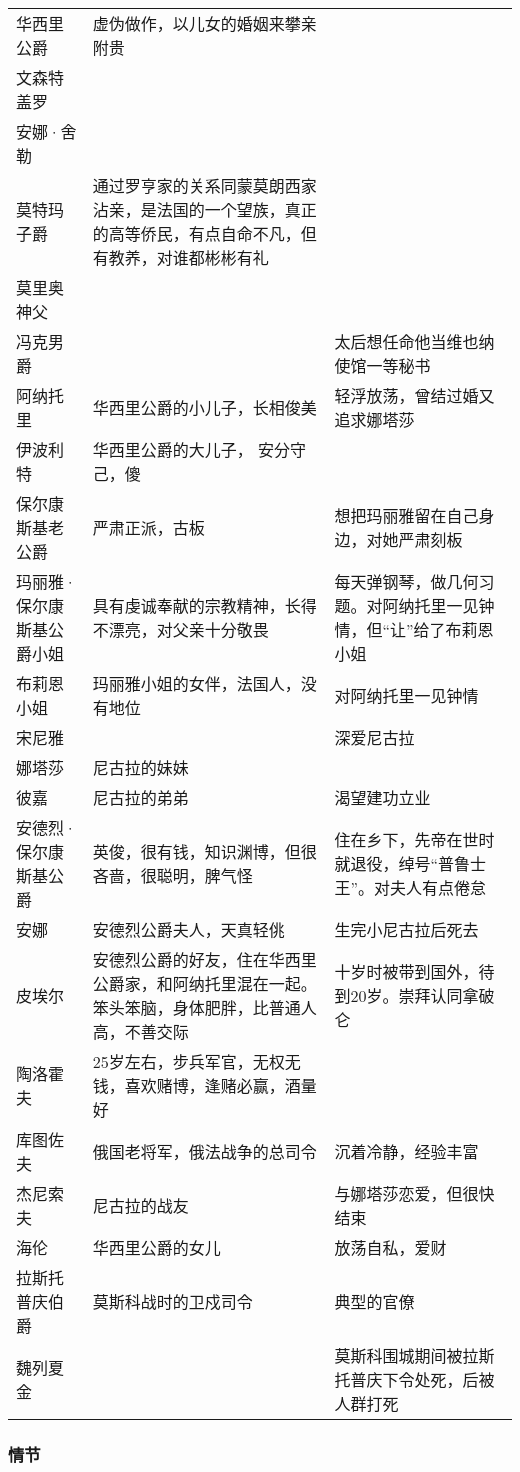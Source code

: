 \begin{longtable}{p{}|p{}|p{}}
华西里公爵 & 虚伪做作，以儿女的婚姻来攀亲附贵 & \\
文森特盖罗 & & \\ 
安娜·舍勒 & & \\
莫特玛子爵 & 通过罗亨家的关系同蒙莫朗西家沾亲，是法国的一个望族，真正的高等侨民，有点自命不凡，但有教养，对谁都彬彬有礼 & \\ 
莫里奥神父 & & \\ 
冯克男爵 & & 太后想任命他当维也纳使馆一等秘书 \\
阿纳托里 & 华西里公爵的小儿子，长相俊美 & 轻浮放荡，曾结过婚又追求娜塔莎 \\
伊波利特 & 华西里公爵的大儿子， 安分守己，傻 & \\ 
保尔康斯基老公爵 & 严肃正派，古板 & 想把玛丽雅留在自己身边，对她严肃刻板 \\
玛丽雅·保尔康斯基公爵小姐 & 具有虔诚奉献的宗教精神，长得不漂亮，对父亲十分敬畏 & 每天弹钢琴，做几何习题。对阿纳托里一见钟情，但“让”给了布莉恩小姐 \\
布莉恩小姐 & 玛丽雅小姐的女伴，法国人，没有地位 & 对阿纳托里一见钟情 \\
宋尼雅 & & 深爱尼古拉 \\
娜塔莎 & 尼古拉的妹妹 & \\ 
彼嘉 & 尼古拉的弟弟 & 渴望建功立业 \\ 
安德烈·保尔康斯基公爵 & 英俊，很有钱，知识渊博，但很吝啬，很聪明，脾气怪 & 住在乡下，先帝在世时就退役，绰号“普鲁士王”。对夫人有点倦怠 \\
安娜 & 安德烈公爵夫人，天真轻佻 & 生完小尼古拉后死去 \\ 
皮埃尔 & 安德烈公爵的好友，住在华西里公爵家，和阿纳托里混在一起。笨头笨脑，身体肥胖，比普通人高，不善交际 & 十岁时被带到国外，待到20岁。崇拜认同拿破仑 \\
陶洛霍夫 & 25岁左右，步兵军官，无权无钱，喜欢赌博，逢赌必赢，酒量好 & \\ 
库图佐夫 & 俄国老将军，俄法战争的总司令 & 沉着冷静，经验丰富 \\
杰尼索夫 & 尼古拉的战友 & 与娜塔莎恋爱，但很快结束 \\
海伦 & 华西里公爵的女儿 & 放荡自私，爱财 \\
拉斯托普庆伯爵 & 莫斯科战时的卫戍司令 & 典型的官僚 \\
魏列夏金 & & 莫斯科围城期间被拉斯托普庆下令处死，后被人群打死 \\
\hline
\end{longtable}

\subsubsection{情节}

